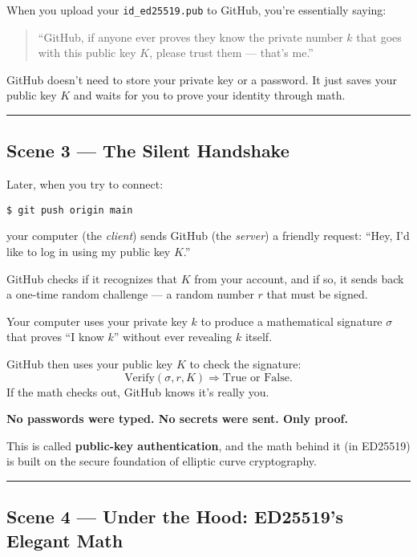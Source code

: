 \documentclass[12pt]{article}
\begin{document}
When you upload your \texttt{id\_ed25519.pub} to GitHub,  
you’re essentially saying:

\begin{quote}
“GitHub, if anyone ever proves they know the private number $k$ that goes with this public key $K$,  
please trust them — that’s me.”
\end{quote}

GitHub doesn’t need to store your private key or a password.  
It just saves your public key $K$ and waits for you to prove your identity through math.

\bigskip
\hrule
\vspace{0.5em}

\subsection*{Scene 3 — The Silent Handshake}

Later, when you try to connect:

\begin{verbatim}
$ git push origin main
\end{verbatim}

your computer (the \emph{client}) sends GitHub (the \emph{server}) a friendly request:
“Hey, I’d like to log in using my public key $K$.”

GitHub checks if it recognizes that $K$ from your account,  
and if so, it sends back a one-time random challenge —  
a random number $r$ that must be signed.

Your computer uses your private key $k$ to produce a mathematical signature $\sigma$  
that proves “I know $k$” without ever revealing $k$ itself.

GitHub then uses your public key $K$ to check the signature:
\[
\text{Verify}(\sigma, r, K) \Rightarrow \text{True or False}.
\]
If the math checks out, GitHub knows it’s really you.

\bigskip
\textbf{No passwords were typed. No secrets were sent. Only proof.}

This is called \textbf{public-key authentication},  
and the math behind it (in ED25519) is built on the secure foundation of elliptic curve cryptography.

\bigskip
\hrule
\vspace{0.5em}

\subsection*{Scene 4 — Under the Hood: ED25519’s Elegant Math}
\end{document}
